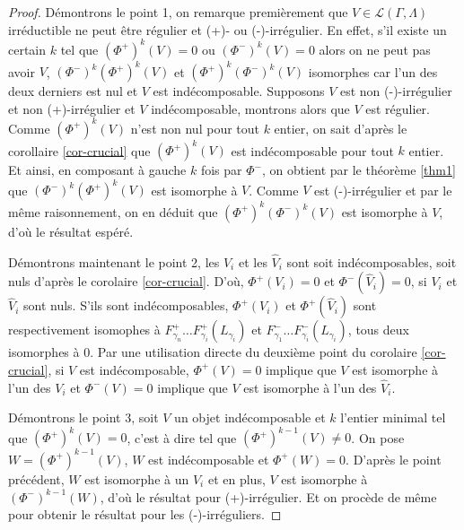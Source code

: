 \documentclass[a4paper,11pt]{article}
\begin{document}
\begin{proof}
  Démontrons le point 1, on remarque premièrement que $V\in \mathscr L(\Gamma,\Lambda)$ irréductible ne peut être régulier et (+)- ou (-)-irrégulier. En effet, s'il existe un certain  $k$ tel que $(\Phi^{+})^{k}(V) = 0$ ou $(\Phi^{-})^{k}(V) = 0$ alors on ne peut pas avoir $V$, $(\Phi^{-})^{k}(\Phi^{+})^{k}(V)$ et $(\Phi^{+})^{k}(\Phi^{-})^{k}(V)$ isomorphes car l'un des deux derniers est nul et $V$ est indécomposable. Supposons $V$ est non (-)-irrégulier et non (+)-irrégulier et $V$ indécomposable, montrons alors que $V$ est régulier. Comme $(\Phi^{+})^{k}(V)$ n'est non nul pour tout $k$ entier, on sait d'après le corollaire \ref{cor-crucial} que $(\Phi^{+})^{k}(V)$ est indécomposable pour tout $k$ entier. Et ainsi, en composant à gauche $k$ fois par $\Phi^{-}$, on obtient par le théorème \ref{thm1} que $(\Phi^{-})^{k}(\Phi^{+})^{k}(V)$ est isomorphe à $V$. Comme $V$ est (-)-irrégulier et par le même raisonnement, on en déduit que $(\Phi^{+})^{k}(\Phi^{-})^{k}(V)$ est isomorphe à $V$, d'où le résultat espéré.

  Démontrons maintenant le point 2, les $V_{i}$ et les $\widehat{V}_{i}$ sont soit indécomposables, soit nuls d'après le corolaire \ref{cor-crucial}. D'où, $\Phi^{+}(V_{i}) =0$ et $\Phi^{-}(\widehat{V}_{i})=0$, si $V_{i}$ et $\widehat{V}_{i}$ sont nuls. S'ils sont indécomposables, $\Phi^{+}(V_{i})$ et $\Phi^{+}(\widehat{V}_{i})$ sont respectivement isomophes à $F^{+}_{\gamma_{n}} \dots F^{+}_{\gamma_{i}}(L_{\gamma_{i}})$ et $F^{-}_{\gamma_{1}} \dots F^{-}_{\gamma_{i}}(L_{\gamma_{i}})$, tous deux isomorphes à 0. Par une utilisation directe du deuxième point du corolaire \ref{cor-crucial}, si $V$ est indécomposable, $\Phi^{+}(V) = 0$ implique que $V$ est isomorphe à l'un des $V_{i}$ et  $\Phi^{-}(V)=0$ implique que $V$ est isomorphe à l'un des $\widehat{V}_{i}$.

Démontrons le point 3, soit $V$ un objet indécomposable et $k$ l'entier minimal tel que $(\Phi^{+})^{k}(V) = 0$, c'est à dire tel que $(\Phi^{+})^{k-1}(V) \neq 0$. On pose $W = (\Phi^{+})^{k-1}(V)$, $W$ est indécomposable et $\Phi^{+}(W) = 0$. D'après le point précédent, $W$ est isomorphe à un $V_{i}$ et en plus, $V$ est isomorphe à $(\Phi^{-})^{k-1}(W)$, d'où le résultat pour (+)-irrégulier. Et on procède de même pour obtenir le résultat pour les (-)-irréguliers. 
\end{proof}
\clearpage
\end{document}
